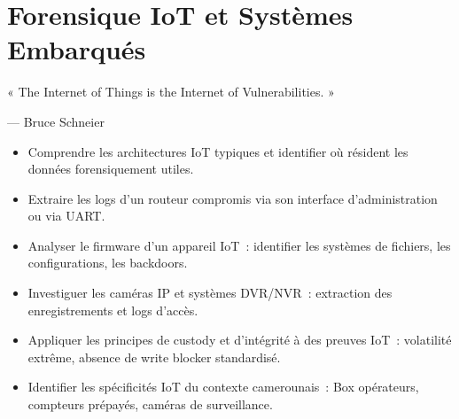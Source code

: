 
\chapter{Forensique IoT et Systèmes Embarqués}
\label{chap:for-iot}

\epigraph{%
    « The Internet of Things is the Internet of Vulnerabilities. »%
}{--- Bruce Schneier}


\begin{boxobjectifs}
\begin{itemize}
    \item Comprendre les architectures IoT typiques et identifier
          où résident les données forensiquement utiles.
    \item Extraire les logs d'un routeur compromis via son interface
          d'administration ou via UART.
    \item Analyser le firmware d'un appareil IoT~: identifier les
          systèmes de fichiers, les configurations, les backdoors.
    \item Investiguer les caméras IP et systèmes DVR/NVR~:
          extraction des enregistrements et logs d'accès.
    \item Appliquer les principes de custody et d'intégrité à des
          preuves IoT~: volatilité extrême, absence de write blocker
          standardisé.
    \item Identifier les spécificités IoT du contexte camerounais~:
          Box opérateurs, compteurs prépayés, caméras de surveillance.
\end{itemize}
\end{boxobjectifs}

